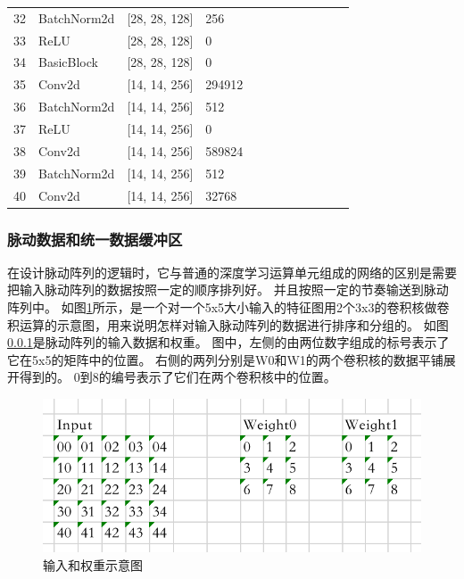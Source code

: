 \begin{table}[!hpt]
\begin{tabular}{@{}llllllllllll@{}}
        32 & BatchNorm2d    & [28, 28, 128]     & 256     &     &                 &                   &             \\  
        33 & ReLU           & [28, 28, 128]     & 0       &     &                 &                   &             \\  
        34 & BasicBlock     & [28, 28, 128]     & 0       &     &                 &                   &             \\  
        35 & Conv2d         & [14, 14, 256]     & 294912  &     &                 &                   &             \\  
        36 & BatchNorm2d    & [14, 14, 256]     & 512     &     &                 &                   &             \\  
        37 & ReLU           & [14, 14, 256]     & 0       &     &                 &                   &             \\  
        38 & Conv2d         & [14, 14, 256]     & 589824  &     &                 &                   &             \\  
        39 & BatchNorm2d    & [14, 14, 256]     & 512     &     &                 &                   &             \\  
        40 & Conv2d         & [14, 14, 256]     & 32768   &     &                 &                   &             \\  

    \end{tabular}
\end{table}

\subsubsection{脉动数据和统一数据缓冲区}
在设计脉动阵列的逻辑时，它与普通的深度学习运算单元组成的网络的区别是需要把输入脉动阵列的数据按照一定的顺序排列好。
并且按照一定的节奏输送到脉动阵列中。
如图\ref{fig:systolic_data}所示，是一个对一个5x5大小输入的特征图用2个3x3的卷积核做卷积运算的示意图，用来说明怎样对输入脉动阵列的数据进行排序和分组的。
如图\ref{}是脉动阵列的输入数据和权重。
图中，左侧的由两位数字组成的标号表示了它在5x5的矩阵中的位置。
右侧的两列分别是W0和W1的两个卷积核的数据平铺展开得到的。
0到8的编号表示了它们在两个卷积核中的位置。

\begin{figure}[htbp]
    \centering
    \includegraphics[width=15cm]{figures/my_systolic_input.png}
    \caption{输入和权重示意图}
    \label{fig:systolic_data}
\end{figure}


